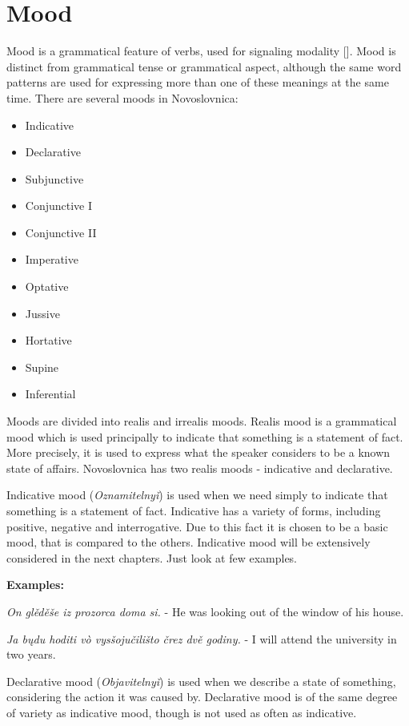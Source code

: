 \section{Mood}

Mood is a grammatical feature of verbs, used for signaling modality []. Mood is distinct from grammatical tense or grammatical aspect, although the same word patterns are used for expressing more than one of these meanings at the same time. There are several moods in Novoslovnica:

\begin{itemize}
	\item Indicative
	\item Declarative
	\item Subjunctive
	\item Conjunctive I
	\item Conjunctive II
	\item Imperative
	\item Optative
	\item Jussive
	\item Hortative
	\item Supine
	\item Inferential
\end{itemize}

Moods are divided into realis and irrealis moods. Realis mood is a grammatical mood which is used principally to indicate that something is a statement of fact. More precisely, it is used to express what the speaker considers to be a known state of affairs. Novoslovnica has two realis moods - indicative and declarative.

Indicative mood (\textit{Oznamitelnyǐ})  is used when we need simply to indicate that something is a statement of fact. Indicative has a variety of forms, including positive, negative and interrogative. Due to this fact it is chosen to be a basic mood, that is compared to the others. Indicative mood will be extensively considered in the next chapters. Just look at few examples.

\textbf{Examples:}

\textit{On glěděše iz prozorca doma si.} - He was looking out of the window of his house.

\textit{Ja bųdu hoditi vò vysšojučilišto črez dvě godiny.} - I will attend the university in two years.

Declarative mood (\textit{Objavitelnyǐ}) is used when we describe a state of something, considering the action it was caused by. Declarative mood is of the same degree of variety as indicative mood, though is not used as often as indicative.

